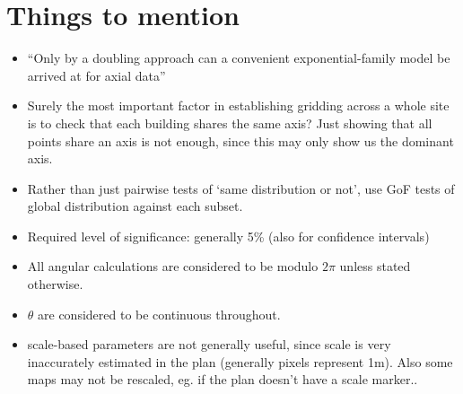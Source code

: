 \documentclass[10pt,fleqn]{article}
\begin{document}
\section*{Things to mention}
\begin{itemize}

\item 
``Only by a doubling approach can a convenient exponential-family model be arrived at for axial data'' \cite{Arnold2011}

\item
Surely the most important factor in establishing gridding across a whole site is to check that each building shares the same axis? Just showing that all points share an axis is not enough, since this may only show us the dominant axis.
 
\item
Rather than just pairwise tests of `same distribution or not', use GoF tests of global distribution against each subset.

\item
Required level of significance: generally 5\% (also for confidence intervals)

\item
All angular calculations are considered to be modulo $2\pi$ unless stated otherwise.

\item
$\theta$ are considered to be continuous throughout.

\item
scale-based parameters are not generally useful, since scale is very inaccurately estimated in the plan (generally  pixels represent 1m). Also some maps may not be rescaled, eg. if the plan doesn't have a scale marker..

\end{itemize}
\newpage



\newpage
\tableofcontents


\newpage


\newpage


\newpage


\newpage


\newpage


\newpage


\newpage


\newpage


\newpage


\newpage




\newpage
\printbibliography
\end{document}
